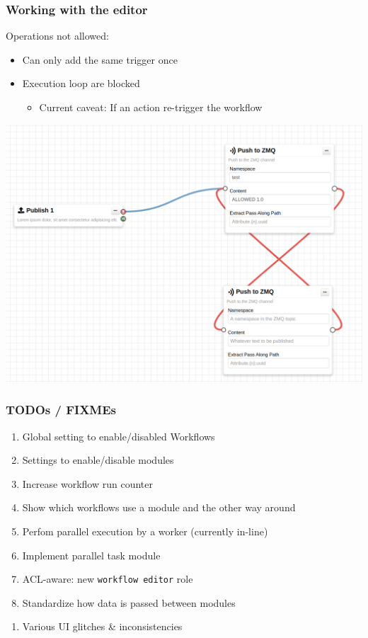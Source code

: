 \begin{frame}
    \frametitle{Working with the editor}
    Operations not allowed:
    \begin{itemize}
        \item Can only add the same trigger once
        \item Execution loop are blocked
        \begin{itemize}
            \item Current caveat: If an action re-trigger the workflow
        \end{itemize}
    \end{itemize}
    \begin{center}
        \includegraphics[width=0.7\linewidth]{pictures/editor-not-allowed-1.png}
    \end{center}
\end{frame}

\begin{frame}
    \frametitle{TODOs / FIXMEs}
    \begin{enumerate}
        \item Global setting to enable/disabled Workflows
        \item Settings to enable/disable modules
        \item Increase workflow run counter
        \item Show which workflows use a module and the other way around
        \item Perfom parallel execution by a worker (currently in-line)
        \item Implement parallel task module
        \item ACL-aware: new \texttt{workflow editor} role
        \item Standardize how data is passed between modules
    \end{enumerate}
    \begin{enumerate}
        \item Various UI glitches \& inconsistencies
    \end{enumerate}
\end{frame}

